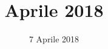 


\title{ Aprile 2018}
\author{\GroupName}

\date{7 Aprile 2018}



\frenchspacing

\makeFrontPage




